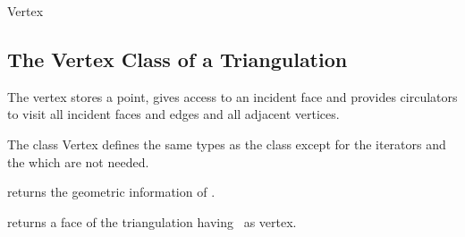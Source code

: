 \begin{ccClass}{Vertex}
\subsection{The Vertex Class of a Triangulation}
\label{I1_Sect_Triangulation_Vertex}

\ccThreeToTwo



\ccDefinition

The vertex stores a point, gives access to an incident face
and provides circulators to visit all incident faces and edges
and all adjacent vertices.


\ccTypes
The class  {Vertex} defines the same types 
as the class  except for the iterators and the 
 which are not needed.








{returns  the geometric information of \ccVar.}

{returns a face of the triangulation having  \ccVar\ as vertex.}






\end{ccClass}
